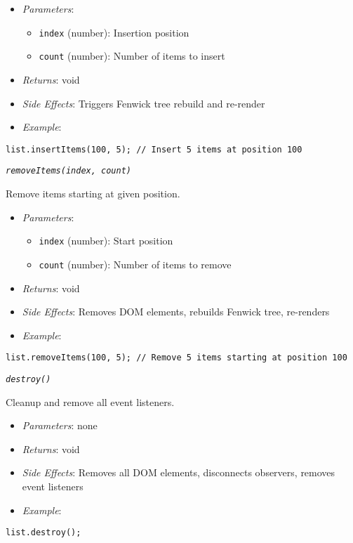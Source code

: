 \documentclass[11pt]{article}
\begin{document}
\begin{itemize}
\item \emph{Parameters}:
\begin{itemize}
\item \texttt{index} (number): Insertion position
\item \texttt{count} (number): Number of items to insert
\end{itemize}

\item \emph{Returns}: void

\item \emph{Side Effects}: Triggers Fenwick tree rebuild and re-render

\item \emph{Example}:
\end{itemize}
\begin{verbatim}
list.insertItems(100, 5); // Insert 5 items at position 100
\end{verbatim}

\emph{\texttt{removeItems(index, count)}}

Remove items starting at given position.

\begin{itemize}
\item \emph{Parameters}:
\begin{itemize}
\item \texttt{index} (number): Start position
\item \texttt{count} (number): Number of items to remove
\end{itemize}

\item \emph{Returns}: void

\item \emph{Side Effects}: Removes DOM elements, rebuilds Fenwick tree, re-renders

\item \emph{Example}:
\end{itemize}
\begin{verbatim}
list.removeItems(100, 5); // Remove 5 items starting at position 100
\end{verbatim}

\emph{\texttt{destroy()}}

Cleanup and remove all event listeners.

\begin{itemize}
\item \emph{Parameters}: none

\item \emph{Returns}: void

\item \emph{Side Effects}: Removes all DOM elements, disconnects observers, removes event listeners

\item \emph{Example}:
\end{itemize}
\begin{verbatim}
list.destroy();
\end{verbatim}
\end{document}

